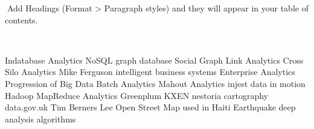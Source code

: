 
Add Headings (Format > Paragraph styles) and they will appear in your table of contents.



Indatabase Analytics
NoSQL graph database
Social Graph Link Analytics
Cross Silo Analytics
Mike Ferguson intelligent business systems
Enterprise Analytics
Progression of Big Data
Batch Analytics
Mahout Analytics
injest
data in motion
Hadoop MapReduce Analytics
Greenplum 
KXEN
nestoria cartography
data.gov.uk
Tim Berners Lee Open Street Map used in Haiti Earthquake
deep analysis algorithms







